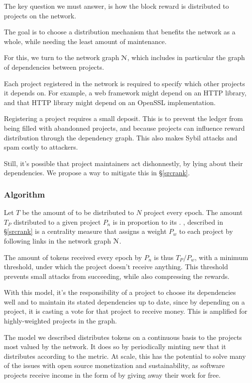 The key question we must answer, is how the block reward is distributed to
projects on the network.

The goal is to choose a distribution mechanism that benefits the network as a
whole, while needing the least amount of maintenance.

For this, we turn to the network graph $\mathcal{N}$, which includes in
particular the graph of dependencies between projects.

Each project registered in the network is required to specify which other
projects it depends on. For example, a web framework might depend on an HTTP
library, and that HTTP library might depend on an OpenSSL implementation.

Registering a project requires a small deposit. This is to prevent the ledger
from being filled with abandonned projects, and because projects can influence
reward distribution through the dependency graph. This also makes  Sybil attacks and spam costly to attackers.

Still, it's possible that project maintainers act dishonnestly, by lying about
their dependencies. We propose a way to mitigate this in \S \ref{srcrank}.

\subsubsection{Algorithm} Let $T$ be the amount of \oscoin{} to be distributed to
$N$ project every epoch. The amount $T_P$ distributed to a given project
$P_n$ is in proportion to its \osrank{}. \osrank{}, described in \S \ref{srcrank}
is a centrality measure that assigns a weight $P_w$ to each project by following
links in the network graph $\mathcal{N}$.

The amount of tokens received every epoch by $P_n$ is thus $T_P / P_w$, with
a minimum threshold, under which the project doesn't receive anything. This
threshold prevents small attacks from succeeding, while also compressing the
rewards.

With this model, it’s the responsibility of a project to choose its
dependencies well and to maintain its stated dependencies up to date, since by
depending on a project, it is casting a vote for that project to receive money.
This is amplified for highly-weighted projects in the graph.

The model we described distributes tokens on a continuous basis to the projects
most valued by the network. It does so by periodically minting new \oscoin{}
that it distributes according to the \osrank{} metric. At scale, this has the
potential to solve many of the issues with open source monetization and
sustainability, as software projects receive income in the form of \oscoin{}
by giving away their work for free.

